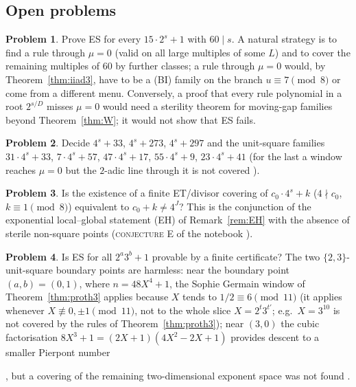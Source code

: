 \documentclass[11pt,reqno]{amsart}
\theoremstyle{definition}
\newtheorem{problem}{Problem}
\newcommand{\status}[1]{\textup{\textsc{#1}}}
\begin{document}
\subsection{Open problems}\label{sec:open}
\begin{problem}
Prove ES for every $15\cdot2^s+1$ with $60\mid s$.  A natural strategy is to
find a rule through $\mu=0$ (valid on all large multiples of some $L$) and to
cover the remaining multiples of $60$ by further classes; a rule through
$\mu=0$ would, by Theorem~\ref{thm:iiad3}, have to be a (BI) family on the
branch $u\equiv7\pmod8$ or come from a different menu.  Conversely, a proof
that every rule polynomial in a root $2^{s/D}$ misses $\mu=0$ would need a
sterility theorem for moving-gap families beyond Theorem~\ref{thm:W}; it
would not show that ES fails.
\end{problem}
\begin{problem}
Decide $4^s+33$, $4^s+273$, $4^s+297$ and the unit-square families
$31\cdot4^s+33$, $7\cdot4^s+57$, $47\cdot4^s+17$, $55\cdot4^s+9$,
$23\cdot4^s+41$ (for the last a window reaches $\mu=0$ but the $2$-adic line
through it is not covered \cite[\S2]{Exp105}).
\end{problem}
\begin{problem}
Is the existence of a finite ET/divisor covering of $c_0\cdot4^s+k$
($4\nmid c_0$, $k\equiv1\pmod8$) equivalent to $c_0+k\ne4^J$?  This is the
conjunction of the exponential local--global statement (EH) of
Remark~\ref{rem:EH} with the absence of sterile non-square points
(\status{conjecture} E of the notebook \cite{ExpNearSq}).
\end{problem}
\begin{problem}
Is ES for all $2^a3^b+1$ provable by a finite certificate?  The two
$\{2,3\}$-unit-square boundary points are harmless: near the boundary point $(a,b)=(0,1)$, where $n=48X^4+1$, the
Sophie Germain window of Theorem~\ref{thm:proth3} applies because $X$ tends
to $1/2\equiv6\pmod{11}$ (it applies whenever $X\not\equiv0,\pm1\pmod{11}$,
not to the whole slice $X=2^t3^{t'}$; e.g.\ $X=3^{10}$ is not covered by
the rules of Theorem~\ref{thm:proth3}); near $(3,0)$ the cubic factorisation
$8X^3+1=(2X+1)(4X^2-2X+1)$ provides descent to a smaller Pierpont number%

, but a covering of the remaining two-dimensional exponent
space was not found \cite[\S1]{Exp15}.
\end{problem}

\appendix
\end{document}
